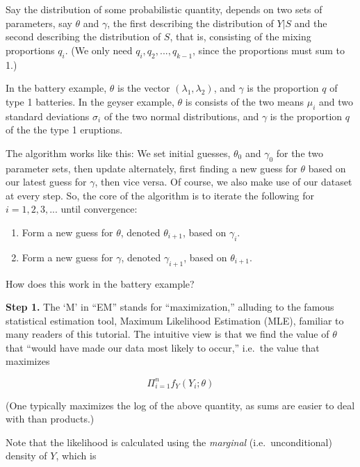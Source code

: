 \documentclass[11pt]{article}
\begin{document}
Say the distribution of some probabilistic quantity, depends on two sets
of parameters, say $\theta$ and $\gamma$, the first describing the
distribution of $Y|S$ and the second describing the distribution of $S$,
that is, consisting of the mixing proportions $q_i$.  (We only need
$q_i,q_2,...,q_{k-1}$, since the proportions must sum to 1.)

In the battery example, $\theta$ is the vector $(\lambda_1,\lambda_2)$,
and $\gamma$ is the proportion $q$ of type 1 batteries.  In the geyser
example, $\theta$ is consists of the two means $\mu_i$ and two standard
deviations $\sigma_i$ of the two normal distributions, and $\gamma$ is
the proportion $q$ of the the type 1 eruptions.  

The algorithm works like this:  We set initial guesses, $\theta_0$ and
$\gamma_0$ for the two parameter sets, then update alternately, first
finding a new guess for $\theta$ based on our latest guess for $\gamma$,
then vice versa.  Of course, we also make use of our dataset at every
step.  So, the core of the algorithm is to iterate the following for
$i=1,2,3,...$ until convergence:

\begin{enumerate}

\item Form a new guess for $\theta$, denoted $\theta_{i+1}$, based
on $\gamma_i$.

\item Form a new guess for $\gamma$, denoted $\gamma_{i+1}$, based
on $\theta_{i+1}$.

\end{enumerate} 

How does this work in the battery example?  

\textbf{Step 1.}  The `M' in ``EM'' stands for ``maximization,''
alluding to the famous statistical estimation tool, Maximum Likelihood
Estimation (MLE), familiar to many readers of this tutorial.  
The intuitive view is that we find the value of $\theta$ that ``would
have made our data most likely to occur,'' i.e.\ the value that maximizes

\begin{equation}
\Pi_{i=1}^n f_{Y}(Y_i; \theta)
\end{equation}

(One typically maximizes the log of the above quantity, as sums are
easier to deal with than products.)

Note that the likelihood is calculated using the \textit{marginal}
(i.e.\ unconditional) density of $Y$, which is
\end{document}
